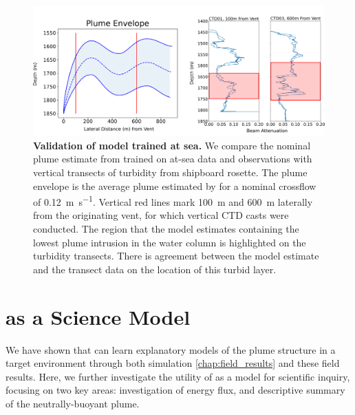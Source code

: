 \begin{figure}[h!]
    \centering
    \includegraphics[width=1\columnwidth]{figures/field_validation.png}
    \caption[Validation of \PHUMES model trained at sea.]{\textbf{Validation of \PHUMES model trained at sea.} We compare the nominal plume estimate from \PHUMES trained on at-sea data and \Sentry observations with vertical transects of turbidity from shipboard rosette. The plume envelope is the average plume estimated by \PHUMES for a nominal crossflow of \SI{0.12}{\meter\per\second}. Vertical red lines mark \SI{100}{\meter} and \SI{600}{\meter} laterally from the originating vent, for which vertical CTD casts were conducted. The region that the model estimates containing the lowest plume intrusion in the water column is highlighted on the turbidity transects. There is agreement between the model estimate and the transect data on the location of this turbid layer.} 
    \label{fig:field_valid}
\end{figure}

\section{\PHUMES as a Science Model}
\label{sec:phumes_as_science}
We have shown that \PHUMES can learn explanatory models of the plume structure in a target environment through both simulation \cref{chap:field_results} and these field results. Here, we further investigate the utility of \PHUMES as a model for scientific inquiry, focusing on two key areas: investigation of energy flux, and descriptive summary of the neutrally-buoyant plume.

